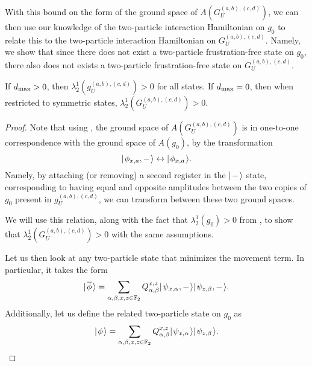 \documentclass[../thesis-main/thesis-main]{subfiles}
\begin{document}
With this bound on the form of the ground space of $A(G_U^{(a,b),(c,d)})$, we can then use our knowledge of the two-particle interaction Hamiltonian on $g_0$ to relate this to the two-particle interaction Hamiltonian on $G_U^{(a,b),(c,d)}$.    Namely, we show that since there does not exist a two-particle frustration-free state on $g_0$, there also does not exists a two-particle frustration-free state on $G_U^{(a,b),(c,d)}$.

\begin{lemma}
  If $d_{\text{max}} >0$, then $\lambda_2^1(g_U^{(a,b),(c,d)}) > 0$ for all states.  If $d_{\text{max}} = 0$, then when restricted to symmetric states, $\lambda_2^1(G_U^{(a,b),(c,d)}) > 0$.
  \label{lem:2particle_element_bound}
\end{lemma}
\begin{proof}
  Note that using , the ground space of $A(G_U^{(a,b),(c,d)})$ is in one-to-one correspondence with the ground space of $A(g_0)$, by the transformation
  \begin{equation}
    |\mspace{2mu} \phi_{x,a},- \mspace{2mu} \rangle \leftrightarrow |\mspace{2mu} \phi_{x,a} \mspace{2mu} \rangle\label{eq:phi_copy_transform}.
  \end{equation}
  Namely, by attaching (or removing) a second register in the $|\mspace{2mu} - \mspace{2mu} \rangle$ state, corresponding to having equal and opposite amplitudes between the two copies of $g_0$ present in $g_U^{(a,b),(c,d)}$, we can transform between these two ground spaces.
  
  We will use this relation, along with the fact that $\lambda_2^1(g_0) > 0$ from , to show that $\lambda_2^1(G_U^{(a,b),(c,d)}) > 0$ with the same assumptions.

  Let us then look at any two-particle state that minimizes the movement term.  In particular, it takes the form
  \begin{equation}
    |\mspace{2mu} \overline{\phi} \mspace{2mu} \rangle = \sum_{\alpha,\beta,x,z\in \mathbb{F}_2} Q_{\alpha,\beta}^{x,z} |\mspace{2mu} \psi_{x,\alpha},- \mspace{2mu} \rangle|\mspace{2mu} \psi_{z,\beta},- \mspace{2mu} \rangle.
  \end{equation}
  Additionally, let us define the related two-particle state on $g_0$ as
  \begin{equation}
     |\mspace{2mu} \phi \mspace{2mu} \rangle = \sum_{\alpha,\beta,x,z\in \mathbb{F}_2} Q_{\alpha,\beta}^{x,z} |\mspace{2mu} \psi_{x,\alpha} \mspace{2mu} \rangle|\mspace{2mu} \psi_{z,\beta} \mspace{2mu} \rangle.
  \end{equation}
  

\end{proof}
\end{document}
